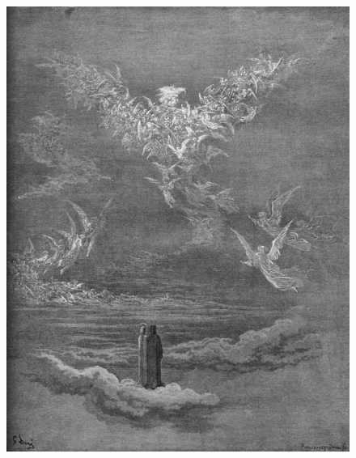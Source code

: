 \documentclass[12pt,xcolor=x11names]{beamer}
\begin{document}
\begin{frame}
    \begin{figure}
        \centering \includegraphics[height=0.75\textheight]{images/emergentdesign.jpg}
    \end{figure}
\end{frame}
\end{document}
